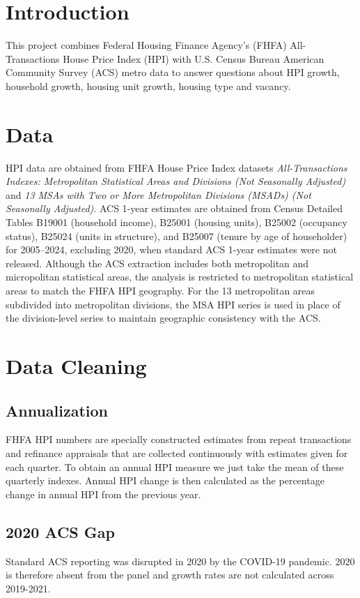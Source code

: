 \documentclass[11pt]{article}
\begin{document}
    \section{Introduction}
        This project combines Federal Housing Finance Agency's (FHFA) All-Transactions House Price Index (HPI) with U.S. Census Bureau American Community Survey (ACS) metro data to answer questions about HPI growth, household growth, housing unit growth, housing type and vacancy.
    \section{Data}
        HPI data are obtained from FHFA House Price Index datasets \textit{All-Transactions Indexes: Metropolitan Statistical Areas and Divisions (Not Seasonally Adjusted)} and \textit{13 MSAs with Two or More Metropolitan Divisions (MSADs) (Not Seasonally Adjusted)}. ACS 1-year estimates are obtained from Census Detailed Tables B19001 (household income), B25001 (housing units), B25002 (occupancy status), B25024 (units in structure), and B25007 (tenure by age of householder) for 2005--2024, excluding 2020, when standard ACS 1-year estimates were not released. Although the ACS extraction includes both metropolitan and micropolitan statistical areas, the analysis is restricted to metropolitan statistical areas to match the FHFA HPI geography. For the 13 metropolitan areas subdivided into metropolitan divisions, the MSA HPI series is used in place of the division-level series to maintain geographic consistency with the ACS.
    \section{Data Cleaning}
    \subsection*{Annualization}
        FHFA HPI numbers are specially constructed estimates from repeat transactions and refinance appraisals that are collected continuously with estimates given for each quarter. To obtain an annual HPI measure we just take the mean of these quarterly indexes. Annual HPI change is then calculated as the percentage change in annual HPI from the previous year.
    \subsection*{2020 ACS Gap}
        Standard ACS reporting was disrupted in 2020 by the COVID-19 pandemic. 2020 is therefore absent from the panel and growth rates are not calculated across 2019-2021.
\end{document}
